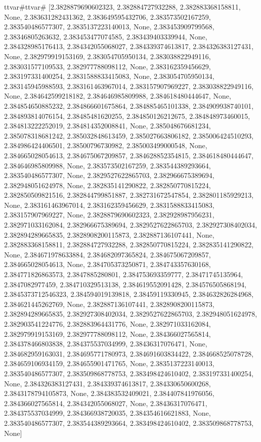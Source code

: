 \documentclass[
  11pt,
  french,
]{article}
\begin{document}
\begin{tcolorbox}[title= Répartition des volumes selon leurs caractéristiques ,colback=boitecode]
ttvar{#}ttvar{#} [2.3828879690602323, 2.382884727932288, 2.382883368158811, None, 2.383631282431362, 2.383649595432706, 2.383573502167259, 2.383540486577307, 2.3835137223140013, None, 2.383453909799568, 2.38346805263632, 2.383453477074585, 2.383439403339944, None, 2.384328985176413, 2.384342055068027, 2.384339374613817, 2.384326383127431, None, 2.382979919153169, 2.383054705950134, 2.383038822949116, 2.383031577109533, 2.382977788098112, None, 2.383162359456629, 2.383197331400254, 2.3831588833415083, None, 2.383054705950134, 2.383145945988593, 2.383161463967014, 2.383157907969227, 2.383038822949116, None, 2.384642599218182, 2.384646985809988, 2.384618480444647, None, 2.384854650885232, 2.384866601675864, 2.384885465101338, 2.384909938740101, 2.384893814076154, 2.38485481620255, 2.384850126212675, 2.384848973460015, 2.384813222252019, 2.384814352008841, None, 2.385048676681234, 2.385078318681242, 2.385032848613459, 2.385027663806182, 2.385006424510293, 2.384986424406501, 2.38500796730982, 2.385003499000548, None, 2.384665028054613, 2.384675067209857, 2.384628852354815, 2.384618480444647, 2.384646985809988, None, 2.383573502167259, 2.383544389293664, 2.383540486577307, None, 2.3829527622865703, 2.382966675389694, 2.382948051624978, None, 2.382835141290822, 2.382850770815224, 2.382850509821516, 2.382844799851887, 2.382731672547854, 2.382801185929213, None, 2.383161463967014, 2.383162359456629, 2.3831588833415083, 2.383157907969227, None, 2.3828879690602323, 2.382928987956231, 2.382971033162084, 2.382966675389694, 2.3829527622865703, 2.382927308402034, 2.382894289665835, 2.3828908200115873, 2.382887136107441, None, 2.382883368158811, 2.382884727932288, 2.382850770815224, 2.382835141290822, None, 2.384671978633884, 2.384682097365824, 2.384675067209857, 2.384665028054613, None, 2.384705373250871, 2.384743357630168, 2.384771826863573, 2.3847885280801, 2.384753693359777, 2.38471745135964, 2.3847082977459, 2.384710329513138, 2.384619552091428, 2.384576505868194, 2.3845373712546323, 2.384594019139818, 2.38459119330945, 2.384632826284968, 2.384621445262769, None, 2.382887136107441, 2.3828908200115873, 2.382894289665835, 2.382927308402034, 2.3829527622865703, 2.382948051624978, 2.382903541224776, 2.382883964431776, None, 2.382971033162084, 2.382979919153169, 2.382977788098112, None, 2.384366027565814, 2.384378466803838, 2.384375537034999, 2.38436317076471, None, 2.384682959163031, 2.384695771780973, 2.384691603834422, 2.384668525078728, 2.384659106934159, 2.384655901471765, None, 2.3835137223140013, 2.383540486577307, 2.383509868778753, 2.383498424610402, 2.383197331400254, None, 2.384326383127431, 2.384339374613817, 2.384330650600268, 2.3843178794105873, None, 2.384383532409021, 2.384407841976056, 2.384366027565814, 2.384342055068027, None, 2.38436317076471, 2.384375537034999, 2.384366938720035, 2.384354616621883, None, 2.383540486577307, 2.383544389293664, 2.383498424610402, 2.383509868778753, None]

\end{tcolorbox}
\end{document}
